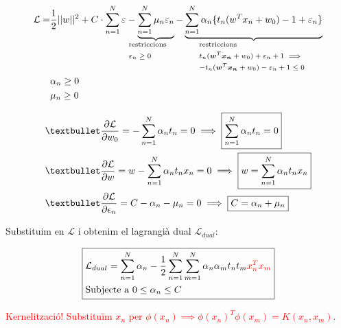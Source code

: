 \begin{align*}
	\mathcal{L} =& \frac{1}{2} ||w||^2  + C \cdot \sum_{n=1}^N \varepsilon - 
	\underbrace{\sum_{n=1}^N \mu_n \varepsilon_n}_{
		\mathclap{\text{\parbox{2cm}{restriccions \\ $\varepsilon_n \ge 0$}}}} 
	-\underbrace{\sum_{n=1}^N \alpha_n \{ t_n (w^T x_n + w_0) - 1 + \varepsilon_n \}}_{\mathclap{
		\text{\parbox{4cm}{restriccions \\ 
				$t_n (\bmath{w}^T \bmath{x_n} + w_0) + \varepsilon_n + 1 \implies$ \\
				$-t_n (\bmath{w}^T \bmath{x_n} + w_0) - \varepsilon_n + 1 \le 0 $ }}
	}} 
	\\
	& \alpha_n \ge 0 \\
	& \mu_n \ge 0
\end{align*}

\begin{align*}
	& \textbullet \frac{\partial \mathcal{L}}{\partial w_0} = - \sum_{n=1}^N \alpha_n t_n = 0 \implies \boxed{\sum_{n=1}^N \alpha_n t_n = 0} \\
	& \textbullet \frac{\partial \mathcal{L}}{\partial w} = w - \sum_{n=1}^N \alpha_n t_n x_n = 0 \implies \boxed{w = \sum_{n=1}^N \alpha_n t_n x_n} \\
	& \textbullet \frac{\partial \mathcal{L}}{\partial \epsilon_n} = C - \alpha_n - \mu_n = 0  \implies \boxed{C= \alpha_n + \mu_n}
\end{align*}
	
Substituim en $\mathcal{L}$ i obtenim el lagrangià dual $\mathcal{L}_{dual}$:

$$
\boxed{
\begin{aligned}
	&\mathcal{L}_{dual} = \sum_{n=1}^N \alpha_n - 
	\frac{1}{2} \sum_{n=1}^N \sum_{m=1}^N \alpha_n \alpha_m t_n t_m \textcolor{red}{x_n^T x_m} \\
	&\text{Subjecte a } 0 \le \alpha_n \le C
\end{aligned}
}
$$

\textcolor{red}{Kernelització! Substituïm $x_n$ per $\phi (x_n) \implies \phi(x_n)^T \phi(x_m) = K(x_n, x_m)$.}

